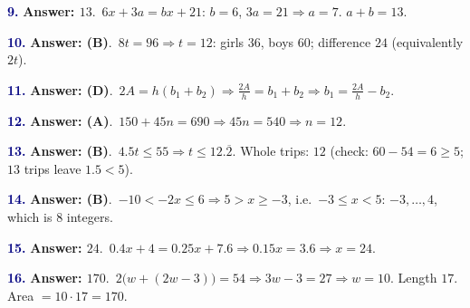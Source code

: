 \documentclass[10pt]{article}
\begin{document}
\begin{minipage}{\linewidth}\textbf{\textcolor{NAVY}{9.}} \textbf{Answer: $13$}.\ $6x+3a=bx+21$: $b=6$, $3a=21\Rightarrow a=7$. $a+b=13$.\end{minipage}\par\vspace{5pt}
\begin{minipage}{\linewidth}\textbf{\textcolor{NAVY}{10.}} \textbf{Answer: (B)}.\ $8t=96\Rightarrow t=12$: girls $36$, boys $60$; difference $24$ (equivalently $2t$).\end{minipage}\par\vspace{5pt}
\begin{minipage}{\linewidth}\textbf{\textcolor{NAVY}{11.}} \textbf{Answer: (D)}.\ $2A=h(b_1+b_2)\Rightarrow\frac{2A}h=b_1+b_2\Rightarrow b_1=\frac{2A}h-b_2$.\end{minipage}\par\vspace{5pt}
\begin{minipage}{\linewidth}\textbf{\textcolor{NAVY}{12.}} \textbf{Answer: (A)}.\ $150+45n=690\Rightarrow45n=540\Rightarrow n=12$.\end{minipage}\par\vspace{5pt}
\begin{minipage}{\linewidth}\textbf{\textcolor{NAVY}{13.}} \textbf{Answer: (B)}.\ $4.5t\le55\Rightarrow t\le12.\overline{2}$. Whole trips: $12$ (check: $60-54=6\ge5$; $13$ trips leave $1.5<5$).\end{minipage}\par\vspace{5pt}
\begin{minipage}{\linewidth}\textbf{\textcolor{NAVY}{14.}} \textbf{Answer: (B)}.\ $-10<-2x\le6\Rightarrow5>x\ge-3$, i.e.\ $-3\le x<5$: $-3,\dots,4$, which is $8$ integers.\end{minipage}\par\vspace{5pt}
\begin{minipage}{\linewidth}\textbf{\textcolor{NAVY}{15.}} \textbf{Answer: $24$}.\ $0.4x+4=0.25x+7.6\Rightarrow0.15x=3.6\Rightarrow x=24$.\end{minipage}\par\vspace{5pt}
\begin{minipage}{\linewidth}\textbf{\textcolor{NAVY}{16.}} \textbf{Answer: $170$}.\ $2\big(w+(2w-3)\big)=54\Rightarrow3w-3=27\Rightarrow w=10$. Length $17$. Area $=10\cdot17=170$.\end{minipage}\par\vspace{5pt}
\end{document}
